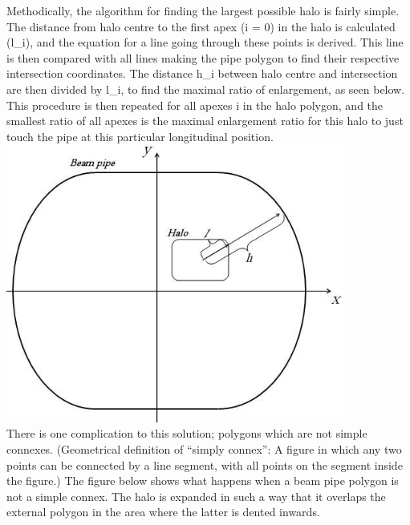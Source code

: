 Methodically, the algorithm for finding the largest possible halo is fairly simple. The distance from halo centre to the first apex (i = 0) in the halo is calculated (l\_i), and the equation for a line going through these points is derived. This line is then compared with all lines making the pipe polygon to find their respective intersection coordinates. The distance h\_i between halo centre and intersection are then divided by l\_i, to find the maximal ratio of enlargement, as seen below. This procedure is then repeated for all apexes i in the halo polygon, and the smallest ratio  of all apexes is the maximal enlargement ratio for this halo to just touch the pipe at this particular longitudinal position.
\\
\includegraphics[width=420px]{Introduction/notsimple0.jpg}
\\  There is one complication to this solution; polygons which are not simple connexes. (Geometrical definition of ``simply connex'': A figure in which any two points can be connected by a line segment, with all points on the segment inside the figure.) The figure below shows what happens when a beam pipe polygon is not a simple connex. The halo is expanded in such a way that it overlaps the external polygon in the area where the latter is dented inwards.
\\
